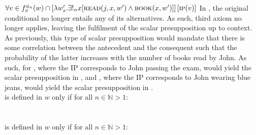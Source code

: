 $\forall v\in f^{\phi_n}_\sigma(w)\cap [\lambda w'_s.\exists!_n{x}[\text{\scshape{read}}(j,x,w')\land\text{\scshape{book}}(x,w')]]\hspace{0.5mm}[\text{\scshape{ip}}(v)]$
\xe
In , the original conditional no longer entails any of its alternatives. As such,  third axiom no longer applies, leaving the fulfilment of the scalar presupposition up to context. As previously, this type of scalar presupposition would mandate that there is some correlation between the antecedent and the consequent such that the probability of the latter increases with the number of books read by John. As such, for , where the IP corresponds to John passing the exam, would yield the scalar presupposition in , and , where the IP corresponds to John wearing blue jeans, would yield the scalar presupposition in .
\ex{}
{}\\ is defined in $w$ only if for all $n\in\mathbb{N}>1$:\\
\\
\xe
\ex{}
{}\\ is defined in $w$ only if for all $n\in\mathbb{N}>1$:\\
\\

